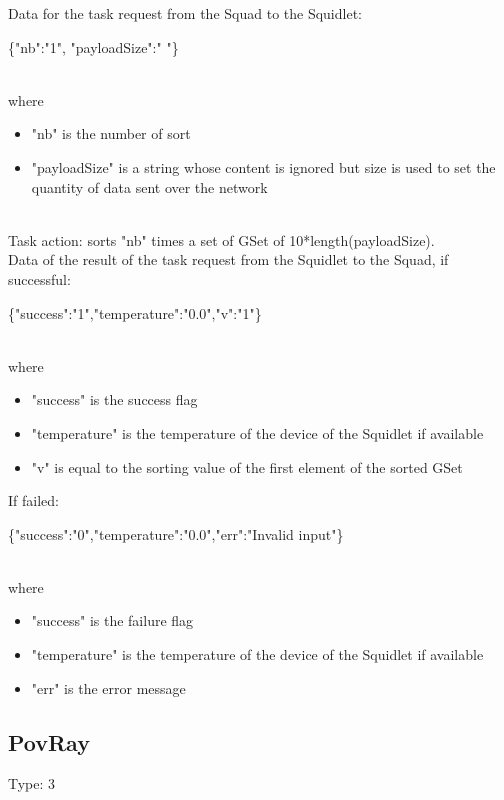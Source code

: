 Data for the task request from the Squad to the Squidlet:\\
\begin{ttfamily}\{"nb":"1", "payloadSize":" "\}\end{ttfamily}\\
where
\begin{itemize}
\item "nb" is the number of sort
\item "payloadSize" is a string whose content is ignored but size is used to set the quantity of data sent over the network
\end{itemize}\\

Task action: sorts "nb" times a set of GSet of 10*length(payloadSize).\\

Data of the result of the task request from the Squidlet to the Squad, if successful:\\
\begin{ttfamily}\{"success":"1","temperature":"0.0","v":"1"\}\end{ttfamily}\\
where
\begin{itemize}
\item "success" is the success flag
\item "temperature" is the temperature of the device of the Squidlet if available
\item "v" is equal to the sorting value of the first element of the sorted GSet
\end{itemize}
If failed:\\
\begin{ttfamily}\{"success":"0","temperature":"0.0","err":"Invalid input"\}\end{ttfamily}\\
where
\begin{itemize}
\item "success" is the failure flag
\item "temperature" is the temperature of the device of the Squidlet if available
\item "err" is the error message
\end{itemize}

\subsection{PovRay}

Type: 3\\

